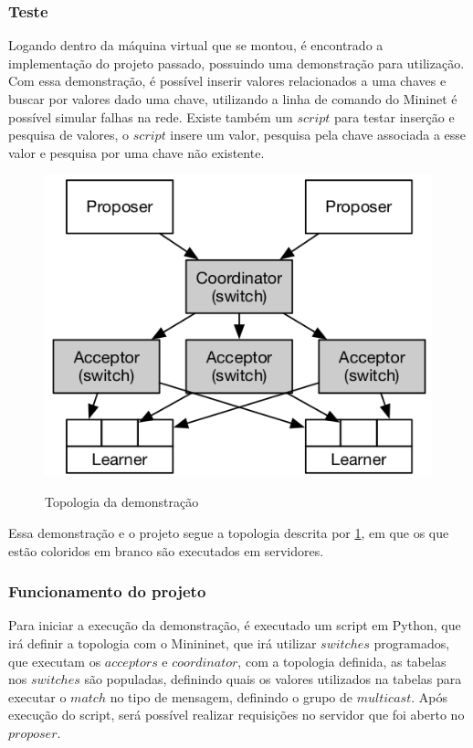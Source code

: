 \documentclass[12pt,
openright, 
oneside,
a4paper,
brazil]{facom-ufu-abntex2}
\theoremstyle{definition}
\begin{document}
\subsubsection{Teste}

Logando dentro da máquina virtual que se montou, é encontrado a implementação do projeto
passado, possuindo uma demonstração para utilização. Com essa demonstração, é possível
inserir valores relacionados a uma chaves e buscar por valores dado uma chave, utilizando
a linha de comando do Mininet é possível simular falhas na rede. Existe também um $script$
para testar inserção e pesquisa de valores, o $script$ insere um valor, pesquisa pela chave
associada a esse valor e pesquisa por uma chave não existente.

\begin{figure}[h]
    \caption{Topologia da demonstração}
    \centering
    \includegraphics[scale=0.8]{images/arq.png}
    \label{fig:demo-topo}
\end{figure}

Essa demonstração e o projeto segue a topologia descrita por \ref{fig:demo-topo}, em que os
que estão coloridos em branco são executados em servidores.

\subsubsection{Funcionamento do projeto}
Para iniciar a execução da demonstração, é executado um script em Python, que irá definir a
topologia com o Minininet, que irá utilizar $switches$ programados, que executam os $acceptors$
e $coordinator$, com a topologia definida, as tabelas nos $switches$ são populadas, definindo
quais os valores utilizados na tabelas para executar o $match$ no tipo de mensagem, definindo o
grupo de $multicast$. Após execução do script, será possível realizar requisições no servidor
que foi aberto no $proposer$.
\end{document}
